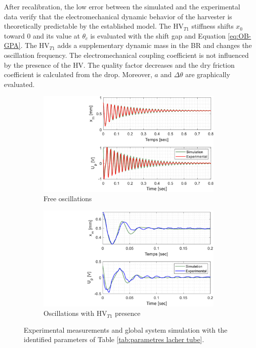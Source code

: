 \documentclass[3p,twocolumn,preprint]{elsarticle}
\begin{document}
After recalibration, the low error between the simulated and the experimental data verify that the electromechanical dynamic behavior of the harvester is theoretically predictable by the established model. The HV$_{T1}$ stiffness shifts $x_0$ toward $0$ and its value at $\theta_c$ is evaluated with the shift gap and Equation \ref{eq:OB-GPA}. The HV$_{T1}$ adds a supplementary dynamic mass in the BR and changes the oscillation frequency. The electromechanical coupling coefficient is not influenced by the presence of the HV. The quality factor decreases and the dry friction coefficient is calculated from the drop. Moreover, $a$ and $\Delta\theta$ are graphically evaluated.
\begin{figure}[!htbp]	
\captionsetup{justification=centering}
	\begin{subfigure}{.49\linewidth}
		\includegraphics[trim={9cm 0cm 0cm 0cm},clip,width=\linewidth]{figures/recalage_free.pdf}
		\caption{Free oscillations}
		\label{fig:recalage_free}
	\end{subfigure}
	\begin{subfigure}{.49\linewidth}
		\includegraphics[trim={8.6cm 0cm 0cm 0cm},clip,width=\linewidth]{figures/recalage_tube.pdf}
		\caption{Oscillations with HV$_{T1}$ presence}
		\label{fig:recalage_tube}
	\end{subfigure}
	\caption{Experimental measurements and global system simulation with the identified parameters of Table \ref{tab:parametres lacher tube}.}
	\label{fig:recalage_global}
\end{figure}
\end{document}
